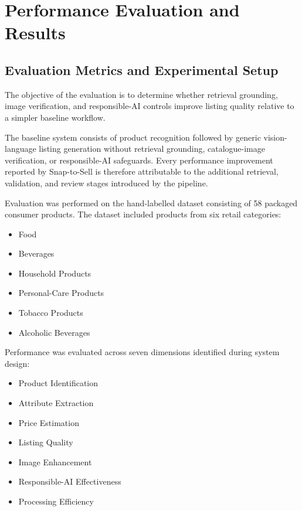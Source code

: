 \documentclass[conference]{IEEEtran}
\begin{document}
\section{Performance Evaluation and Results}

\subsection{Evaluation Metrics and Experimental Setup}

The objective of the evaluation is to determine whether retrieval grounding,
image verification, and responsible-AI controls improve listing quality relative
to a simpler baseline workflow.

The baseline system consists of product recognition followed by generic
vision-language listing generation without retrieval grounding,
catalogue-image verification, or responsible-AI safeguards. Every performance
improvement reported by Snap-to-Sell is therefore attributable to the
additional retrieval, validation, and review stages introduced by the
pipeline. 

Evaluation was performed on the hand-labelled dataset consisting of
58 packaged consumer products. The dataset included products from six retail
categories:

\begin{itemize}
\item Food
\item Beverages
\item Household Products
\item Personal-Care Products
\item Tobacco Products
\item Alcoholic Beverages
\end{itemize}

Performance was evaluated across seven dimensions identified during system
design:

\begin{itemize}
\item Product Identification
\item Attribute Extraction
\item Price Estimation
\item Listing Quality
\item Image Enhancement
\item Responsible-AI Effectiveness
\item Processing Efficiency
\end{itemize}
\end{document}
